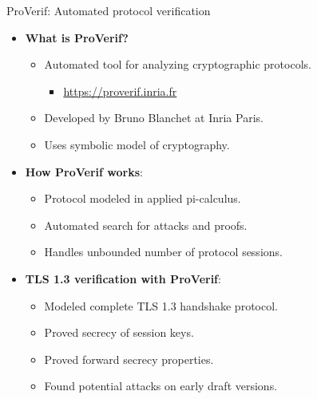 \documentclass[aspectratio=169, lualatex, handout]{beamer}
\begin{document}
\begin{frame}{ProVerif: Automated protocol verification}
	\begin{itemize}[<+->]
		\item \textbf{What is ProVerif?}
		      \begin{itemize}
			      \item Automated tool for analyzing cryptographic protocols.
			            \begin{itemize}
				            \item \url{https://proverif.inria.fr}
			            \end{itemize}
			      \item Developed by Bruno Blanchet at Inria Paris.
			      \item Uses symbolic model of cryptography.
		      \end{itemize}
		\item \textbf{How ProVerif works}:
		      \begin{itemize}
			      \item Protocol modeled in applied pi-calculus.
			      \item Automated search for attacks and proofs.
			      \item Handles unbounded number of protocol sessions.
		      \end{itemize}
		\item \textbf{TLS 1.3 verification with ProVerif}:
		      \begin{itemize}
			      \item Modeled complete TLS 1.3 handshake protocol.
			      \item Proved secrecy of session keys.
			      \item Proved forward secrecy properties.
			      \item Found potential attacks on early draft versions.
		      \end{itemize}
	\end{itemize}
\end{frame}
\end{document}
